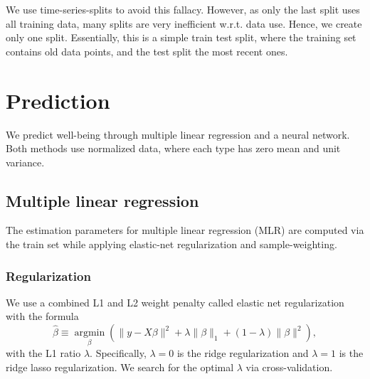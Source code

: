 \documentclass[conference]{IEEEtran}
\begin{document}
We use time-series-splits to avoid this fallacy. However, as only the last split uses all training data, many splits are very inefficient w.r.t. data use. Hence, we create only one split. Essentially, this is a simple train test split, where the training set contains old data points, and the test split the most recent ones.



\section{Prediction}
We predict well-being through multiple linear regression and a neural network. Both methods use normalized data, where each type has zero mean and unit variance.


\subsection{Multiple linear regression}
The estimation parameters for multiple linear regression (MLR) are computed via the train set while applying elastic-net regularization and sample-weighting.


\subsubsection{Regularization}
We use a combined L1 and L2 weight penalty called elastic net regularization with the formula 
\begin{equation}
\hat{\beta} \equiv \underset{\beta}{\operatorname{argmin}}\left(\|y-X \beta\|^{2}+\lambda\|\beta\|_{1}+(1-\lambda)\|\beta\|^{2}\right),
\end{equation}
with the L1 ratio $\lambda$.
Specifically, $\lambda=0$ is the ridge regularization and $\lambda=1$ is the ridge lasso regularization. We search for the optimal $\lambda$ via cross-validation.
\end{document}
